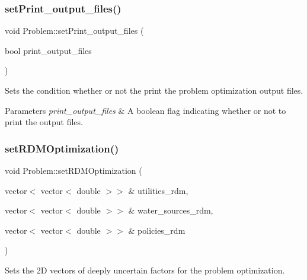 \subsubsection{\texorpdfstring{set\+Print\+\_\+output\+\_\+files()}{setPrint\_output\_files()}}
{\footnotesize\ttfamily void Problem\+::set\+Print\+\_\+output\+\_\+files (\begin{DoxyParamCaption}\item[{bool}]{print\+\_\+output\+\_\+files }\end{DoxyParamCaption})}



Sets the condition whether or not the print the problem optimization output files. 


\begin{DoxyParams}{Parameters}
{\em print\+\_\+output\+\_\+files} & A boolean flag indicating whether or not to print the output files. \\
\hline
\end{DoxyParams}
\mbox{\label{classProblem_a98115002e741e9220f7aa6bae0cb179c}} 
\subsubsection{\texorpdfstring{set\+R\+D\+M\+Optimization()}{setRDMOptimization()}}
{\footnotesize\ttfamily void Problem\+::set\+R\+D\+M\+Optimization (\begin{DoxyParamCaption}\item[{vector$<$ vector$<$ double $>$$>$ \&}]{utilities\+\_\+rdm,  }\item[{vector$<$ vector$<$ double $>$$>$ \&}]{water\+\_\+sources\+\_\+rdm,  }\item[{vector$<$ vector$<$ double $>$$>$ \&}]{policies\+\_\+rdm }\end{DoxyParamCaption})}



Sets the 2D vectors of deeply uncertain factors for the problem optimization. 


